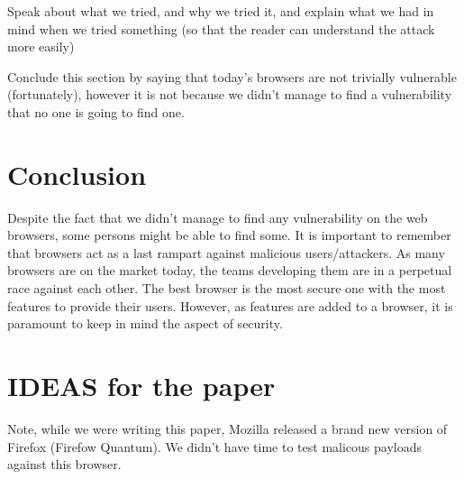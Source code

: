 \documentclass[journal]{IEEEtran}
\begin{document}
\medskip

Speak about what we tried, and why we tried it, and explain what we had in mind when we tried something (so that the reader can understand the attack more easily)

\medskip

Conclude this section by saying that today's browsers are not trivially vulnerable (fortunately), however it is not because we didn't manage to find a vulnerability that no one is going to find one.

\section{Conclusion}
Despite the fact that we didn't manage to find any vulnerability on the web browsers, some persons might be able to find some. It is important to remember that browsers act as a last rampart against malicious users/attackers. As many browsers are on the market today, the teams developing them are in a perpetual race against each other. The best browser is the most secure one with the most features to provide their users. However, as features are added to a browser, it is paramount to keep in mind the aspect of security.

\section{IDEAS for the paper}
Note, while we were writing this paper, Mozilla released a brand new version of Firefox (Firefow Quantum). We didn't have time to test malicous payloads against this browser.




%
\end{document}
